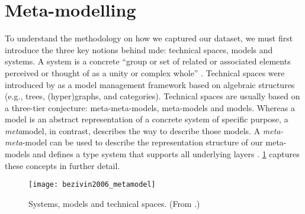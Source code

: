 \section{Meta-modelling}

\noindent
{}

To understand the methodology on how we captured our dataset, we must first introduce the three key notions behind \gls{mde}: technical spaces, models and systems. A system is a concrete ``group or set of related or associated elements perceived or thought of as a unity or complex whole'' \citep{oed:system}. Technical spaces were introduced by \citet{Bezivin:2002} as a model management framework based on algebraic structures (e.g., trees, (hyper)graphs, and categories). Technical spaces are usually based on a three-tier conjecture: meta-meta-models, meta-models and models. Whereas a model is an abstract representation of  a concrete system of specific purpose, a \textit{meta}model, in contrast, describes the way to describe those models. A \textit{meta-meta}-model can be used to describe the representation structure of our meta-models and defines a type system \cite{Cardelli:1985ee} that supports all underlying layers \citep{Bezivin:2006gw}. \cref{fig:dataset:bezivin2006_metamodel} captures these concepts in further detail.

\begin{figure}[h]
  \centering
  \texttt{[image: bezivin2006\_metamodel]}
  \caption[An overview of systems, models and technical spaces]{Systems, models and technical spaces. (From \citep{Bezivin:2006gw}.)}
  \label{fig:dataset:bezivin2006_metamodel}
\end{figure}

\noindent
{}